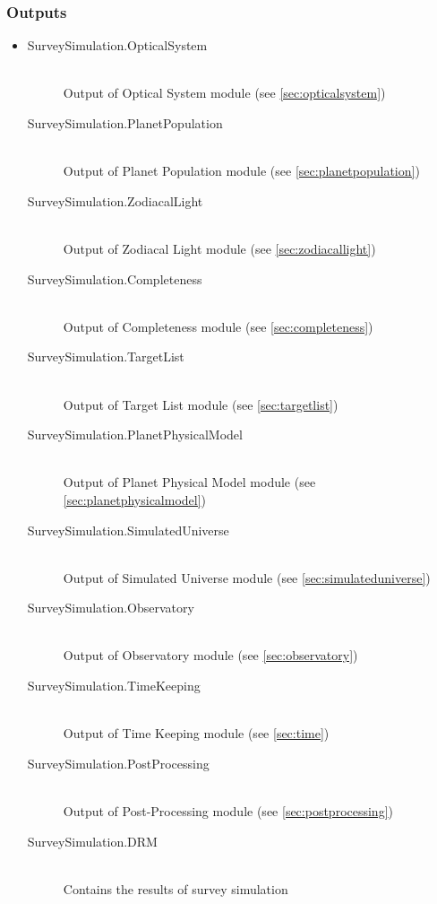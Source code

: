 \documentclass[cleanfoot]{asme2ej}
\begin{document}
\subsubsection*{Outputs}
\begin{itemize}
    \item
    \begin{description}
        \item[SurveySimulation.OpticalSystem] \hfill \\
        Output of Optical System module (see \ref{sec:opticalsystem})
        \item[SurveySimulation.PlanetPopulation] \hfill \\
        Output of Planet Population module (see \ref{sec:planetpopulation})
        \item[SurveySimulation.ZodiacalLight] \hfill \\
        Output of Zodiacal Light module (see \ref{sec:zodiacallight})
        \item[SurveySimulation.Completeness] \hfill \\
        Output of Completeness module (see \ref{sec:completeness})
        \item[SurveySimulation.TargetList] \hfill \\
        Output of Target List module (see \ref{sec:targetlist})
        \item[SurveySimulation.PlanetPhysicalModel] \hfill \\
        Output of Planet Physical Model module (see \ref{sec:planetphysicalmodel})
        \item[SurveySimulation.SimulatedUniverse] \hfill \\
        Output of Simulated Universe module (see \ref{sec:simulateduniverse})
        \item[SurveySimulation.Observatory] \hfill \\
        Output of Observatory module (see \ref{sec:observatory})
        \item[SurveySimulation.TimeKeeping] \hfill \\
        Output of Time Keeping module (see \ref{sec:time})
        \item[SurveySimulation.PostProcessing] \hfill \\
        Output of Post-Processing module (see \ref{sec:postprocessing})
        \item[SurveySimulation.DRM] \hfill \\
        Contains the results of survey simulation
    \end{description}
\end{itemize}
\end{document}

